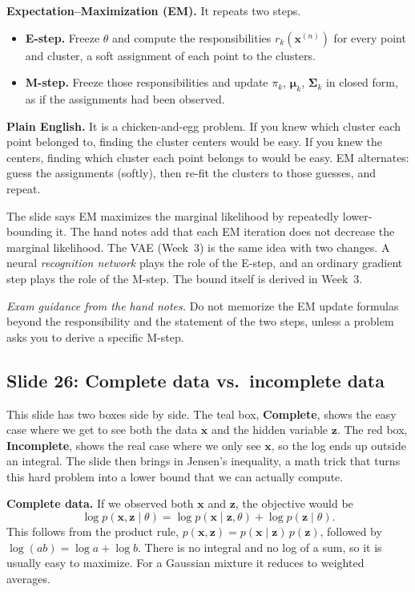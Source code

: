 \textbf{Expectation--Maximization (EM).} It repeats two steps.
\begin{itemize}
\item \textbf{E-step.} Freeze $\theta$ and compute the responsibilities $r_k(\mathbf{x}^{(n)})$ for every point and cluster, a soft assignment of each point to the clusters.
\item \textbf{M-step.} Freeze those responsibilities and update $\pi_k$, $\boldsymbol{\mu}_k$, $\boldsymbol{\Sigma}_k$ in closed form, as if the assignments had been observed.
\end{itemize}
\textbf{Plain English.} It is a chicken-and-egg problem. If you knew which cluster each point belonged to, finding the cluster centers would be easy. If you knew the centers, finding which cluster each point belongs to would be easy. EM alternates: guess the assignments (softly), then re-fit the clusters to those guesses, and repeat.

The slide says EM maximizes the marginal likelihood by repeatedly lower-bounding it. The hand notes add that each EM iteration does not decrease the marginal likelihood. The VAE (Week~3) is the same idea with two changes. A neural \textit{recognition network} plays the role of the E-step, and an ordinary gradient step plays the role of the M-step. The bound itself is derived in Week~3.

\textit{Exam guidance from the hand notes.} Do not memorize the EM update formulas beyond the responsibility and the statement of the two steps, unless a problem asks you to derive a specific M-step.

\subsection*{Slide 26: Complete data vs.\ incomplete data}

This slide has two boxes side by side. The teal box, \textbf{Complete}, shows the easy case where we get to see both the data $\mathbf{x}$ and the hidden variable $\mathbf{z}$. The red box, \textbf{Incomplete}, shows the real case where we only see $\mathbf{x}$, so the log ends up outside an integral. The slide then brings in Jensen's inequality, a math trick that turns this hard problem into a lower bound that we can actually compute.

\textbf{Complete data.} If we observed both $\mathbf{x}$ and $\mathbf{z}$, the objective would be
\[
\log p(\mathbf{x},\mathbf{z}\mid\theta)=\log p(\mathbf{x}\mid\mathbf{z},\theta)+\log p(\mathbf{z}\mid\theta).
\]
This follows from the product rule, $p(\mathbf{x},\mathbf{z})=p(\mathbf{x}\mid\mathbf{z})\,p(\mathbf{z})$, followed by $\log(ab)=\log a+\log b$. There is no integral and no log of a sum, so it is usually easy to maximize. For a Gaussian mixture it reduces to weighted averages.

